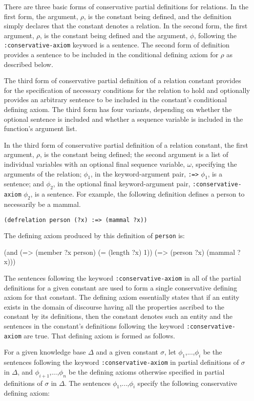 There are three basic forms of conservative partial definitions for relations.
 In the first form, the argument, $\rho$, is the constant being defined, and
the definition simply declares that the constant denotes a relation.  In the
second form, the first argument, $\rho$, is the constant being defined and the
argument, $\phi$, following the {\tt :conservative-axiom} keyword is a
sentence.  The second form of definition provides a sentence to be included in
the conditional defining axiom for $\rho$ as described below.

The third form of conservative partial definition of a relation constant
provides for the specification of necessary conditions for the relation to
hold and optionally provides an arbitrary sentence to be included in the
constant's conditional defining axiom.  The third form has four variants,
depending on whether the optional sentence is included and whether a sequence variable is included in the function's argument list.

In the third form of conservative partial definition of a relation constant,
the first argument, $\rho$, is the constant being defined; the second argument
is a list of individual variables with an optional final sequence variable,
$\omega$, specifying the arguments of the relation; $\phi_1$, in the
keyword-argument pair, {\tt :=>} $\phi_1$, is a sentence; and $\phi_2$, in the
optional final keyword-argument pair, {\tt :conservative-axiom} $\phi_2$, is a
sentence.  For example, the following definition defines a person to
necessarily be a mammal.

\medskip
{\tt (defrelation person (?x) :=> (mammal ?x))}
\medskip

The defining axiom produced by this definition of {\tt person} is:

\medskip
\beginverbatim
(and (=> (member ?x person) (= (length ?x) 1))
     (=> (person ?x) (mammal ?x)))
\endverbatim
\medskip

The sentences following the keyword {\tt :conservative-axiom} in all of the 
partial definitions for a given constant are used to form a single
conservative defining axiom for that constant.  The defining axiom essentially states that if an entity exists in the domain of discourse having all the properties ascribed to the constant by its definitions, then the constant denotes such an entity and the sentences in the constant's definitions following the keyword {\tt :conservative-axiom} are true.  That defining axiom is formed as follows.

For a given knowledge base $\Delta$ and a given constant $\sigma$, let 
$\phi_1$,...,$\phi_i$ be the sentences following the keyword
{\tt :conservative-axiom} in partial definitions of $\sigma$ in $\Delta$, and 
$\phi_{i+1}$,...,$\phi_n$ be the defining axioms otherwise specified in
partial definitions of $\sigma$ in $\Delta$.  The sentences
$\phi_1$,...,$\phi_i$ specify the following conservative defining axiom:

